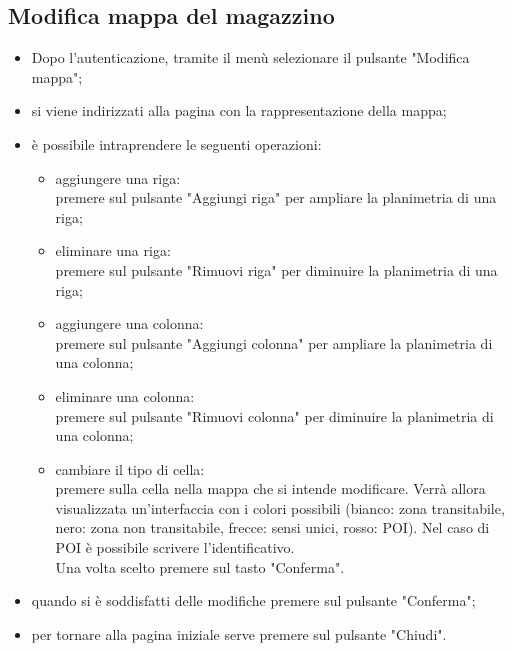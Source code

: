 \subsection{Modifica mappa del magazzino}
\begin{itemize}
    \item Dopo l'autenticazione, tramite il menù selezionare il pulsante "Modifica mappa";
    \item si viene indirizzati alla pagina con la rappresentazione della mappa;
    \item è possibile intraprendere le seguenti operazioni:
        \begin{itemize}
            \item aggiungere una riga: \\premere sul pulsante "Aggiungi riga" per ampliare la planimetria di una riga;
            \item eliminare una riga: \\premere sul pulsante "Rimuovi riga" per diminuire la planimetria di una riga;
            \item aggiungere una colonna: \\premere sul pulsante "Aggiungi colonna" per ampliare la planimetria di una colonna;
            \item eliminare una colonna: \\premere sul pulsante "Rimuovi colonna" per diminuire la planimetria di una colonna;
            \item cambiare il tipo di cella: \\premere sulla cella nella mappa che si intende modificare. Verrà allora visualizzata un'interfaccia con i colori possibili (bianco: zona transitabile, nero: zona non transitabile, frecce: sensi unici, rosso: POI). Nel caso di POI è possibile scrivere l'identificativo. \\Una volta scelto premere sul tasto "Conferma".
        \end{itemize}
    \item quando si è soddisfatti delle modifiche premere sul pulsante "Conferma";
    \item per tornare alla pagina iniziale serve premere sul pulsante "Chiudi".
\end{itemize}


